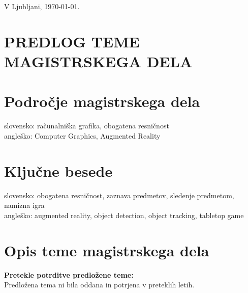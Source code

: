 \documentclass[a4paper, 12pt]{article}
\begin{document}
\bigskip


\hfill V Ljubljani, \today. \\
%

\clearpage
\section{PREDLOG TEME MAGISTRSKEGA DELA}

\section{Področje magistrskega dela}

slovensko: računalniška grafika, obogatena resničnost\\
angleško: Computer Graphics, Augmented Reality

\section{Ključne besede}

slovensko: obogatena resničnost, zaznava predmetov, sledenje predmetom, namizna igra \\
angleško: augmented reality, object detection, object tracking, tabletop game

\section{Opis teme magistrskega dela}

\textbf{Pretekle potrditve predložene teme:}\\
Predložena tema ni bila oddana in potrjena v preteklih letih.
\end{document}
